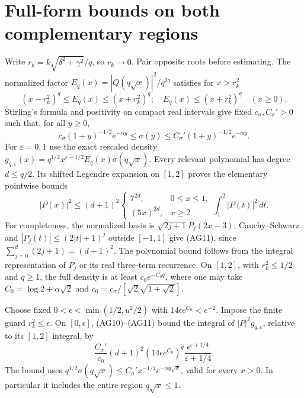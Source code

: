 \documentclass[11pt]{article}
\newcommand{\dd}{\,d}\newcommand{\Gram}{\operatorname{Gram}}
\begin{document}
\section{Full-form bounds on both complementary regions}
Write $r_k=k\sqrt{\delta^2+\gamma^2}/q$, so $r_k\to0$.
Pair opposite roots before estimating. The normalized factor
$E_q(x)=|Q(q\sqrt x)|^2/q^{2q}$ satisfies for $x>r_k^2$
\begin{equation}\tag{AG10}
 (x-r_k^2)^q\le E_q(x)\le(x+r_k^2)^q;
 \quad E_q(x)\le(x+r_k^2)^q\quad(x\ge0).
\end{equation}
Stirling's formula and positivity on compact real intervals give fixed
$c_\sigma,C_\sigma'>0$ such that, for all $y\ge0$,
\[
 c_\sigma(1+y)^{-1/2}e^{-\alpha y}
 \le\sigma(y)\le C_\sigma'(1+y)^{-1/2}e^{-\alpha y}.
\]
For $\varepsilon=0,1$ use the exact rescaled density
$g_{q,\varepsilon}(x)=q^{1/2}x^{\varepsilon-1/2}E_q(x)\sigma(q\sqrt x)$.
Every relevant polynomial has degree $d\le q/2$. Its shifted Legendre
expansion on $[1,2]$ proves the elementary pointwise bounds
\begin{equation}\tag{AG11}
 |P(x)|^2\le(d+1)^2
 \begin{cases}7^{2d},&0\le x\le1,\\(5x)^{2d},&x\ge2\end{cases}
 \int_1^2|P(t)|^2\dd t.
\end{equation}
For completeness, the normalized basis is
$\sqrt{2j+1}P_j(2x-3)$; Cauchy--Schwarz and
$|P_j(t)|\le(2|t|+1)^j$ outside $[-1,1]$ give (AG11), since
$\sum_{j=0}^d(2j+1)=(d+1)^2$. The polynomial bound follows from the
integral representation of $P_j$ or its real three-term recurrence.
On $[1,2]$, with $r_k^2\le1/2$ and $q\ge1$, the full density is at least
$c_0e^{-C_0q}$, where one may take
$C_0=\log2+\alpha\sqrt2$ and
$c_0=c_\sigma/[\sqrt2\sqrt{1+\sqrt2}]$.

Choose fixed $0<\epsilon<\min(1/2,u^2/2)$ with
$14\epsilon e^{C_0}<e^{-2}$. Impose the finite guard $r_k^2\le\epsilon$.
On $[0,\epsilon]$, (AG10)--(AG11) bound the integral of
$|P|^2g_{q,\varepsilon}$, relative to its $[1,2]$ integral, by
\begin{equation}\tag{AG12}
 \frac{C_\sigma'}{c_0}(d+1)^2
 (14\epsilon e^{C_0})^q
 \frac{\epsilon^{\varepsilon+1/4}}{\varepsilon+1/4}.
\end{equation}
The bound uses $q^{1/2}\sigma(q\sqrt x)\le
C_\sigma'x^{-1/4}e^{-\alpha q\sqrt x}$, valid for every $x>0$.
In particular it includes the entire region $q\sqrt x\le1$.
\end{document}
